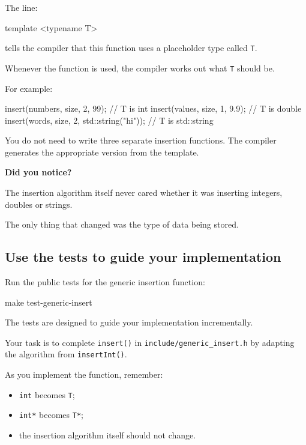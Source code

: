 \documentclass{csc2059practical}
\begin{document}
The line:

\begin{cppcode}
template <typename T>
\end{cppcode}

tells the compiler that this function uses a placeholder type called \texttt{T}.

Whenever the function is used, the compiler works out what \texttt{T} should be.

For example:

\begin{cppcode}
insert(numbers, size, 2, 99);              // T is int
insert(values, size, 1, 9.9);              // T is double
insert(words, size, 2, std::string("hi")); // T is std::string
\end{cppcode}

You do not need to write three separate insertion functions. The compiler generates the appropriate version from the template.

\begin{tipbox}
\textbf{Did you notice?}

The insertion algorithm itself never cared whether it was inserting integers, doubles or strings.

The only thing that changed was the type of data being stored.
\end{tipbox}

\subsection{Use the tests to guide your implementation}

Run the public tests for the generic insertion function:

\begin{terminal}
make test-generic-insert
\end{terminal}

The tests are designed to guide your implementation incrementally.

Your task is to complete \texttt{insert()} in \texttt{include/generic_insert.h} by adapting the algorithm from \texttt{insertInt()}.

As you implement the function, remember:

\begin{itemize}
    \item \texttt{int} becomes \texttt{T};
    \item \texttt{int*} becomes \texttt{T*};
    \item the insertion algorithm itself should not change.
\end{itemize}
\end{document}
